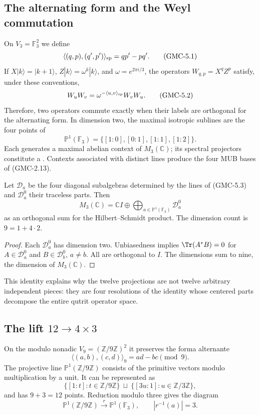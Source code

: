 \subsection{The alternating form and the Weyl commutation}

On $V_3=\mathbb F_3^2$ we define
\[
 \langle(q,p),(q',p')\rangle_{\rm sp}=qp'-pq'.
 \tag{GMC-5.1}
\]
If $X|k\rangle=|k+1\rangle$,
$Z|k\rangle=\omega^k|k\rangle$, and $\omega=e^{2\pi i/3}$, the operators
$W_{q,p}=X^qZ^p$ satisfy, under these conventions,
\[
 W_uW_v=\omega^{-\langle u,v\rangle_{\rm sp}}W_vW_u.
 \tag{GMC-5.2}
\]
Therefore, two operators commute exactly when their labels are
orthogonal for the alternating form. In dimension two, the maximal
isotropic sublines are the four points of
\[
 \mathbb P^1(\mathbb F_3)=\{[1:0],[0:1],[1:1],[1:2]\}.
 \tag{GMC-5.3}
\]
Each generates a maximal abelian context of $M_3(\mathbb C)$; its
spectral projectors constitute a \PVM. Contexts associated with distinct
lines produce the four MUB bases of \textup{(GMC-2.13)}.

\begin{proposition}
\label{p12-83-c2-s4:gmc:prop:descomposicion-masa-qutrit}
Let $\mathcal D_a$ be the four diagonal subalgebras determined by the
lines of \textup{(GMC-5.3)} and $\mathcal D_a^0$ their traceless parts. Then
\[
 M_3(\mathbb C)
 =\mathbb CI\oplus
   \bigoplus_{a\in\mathbb P^1(\mathbb F_3)}\mathcal D_a^0
 \tag{GMC-5.4}
\]
as an orthogonal sum for the Hilbert--Schmidt product. The dimension
count is $9=1+4\cdot2$.
\end{proposition}

\begin{proof}
Each $\mathcal D_a^0$ has dimension two. Unbiasedness implies
$\Tr(A^*B)=0$ for $A\in\mathcal D_a^0$ and
$B\in\mathcal D_b^0$, $a\ne b$. All are orthogonal to $I$. The
dimensions sum to nine, the dimension of $M_3(\mathbb C)$.
\end{proof}

This identity explains why the twelve projections are not twelve arbitrary
independent pieces: they are four resolutions of the identity whose centered
parts decompose the entire qutrit operator space.

\subsection{The lift \texorpdfstring{$12\to4\times3$}{12 to 4 by 3}}

On the modulo nonadic $V_9=(\mathbb Z/9\mathbb Z)^2$ it preserves the forma
alternante
\[
 \langle(a,b),(c,d)\rangle_9=ad-bc\pmod9.
 \tag{GMC-5.5}
\]
The projective line $\mathbb P^1(\mathbb Z/9\mathbb Z)$ consists of
the primitive vectors modulo multiplication by a unit. It can
be represented as
\[
 \{[1:t]:t\in\mathbb Z/9\mathbb Z\}
 \ \sqcup\ 
 \{[3u:1]:u\in\mathbb Z/3\mathbb Z\},
 \tag{GMC-5.6}
\]
and has $9+3=12$ points. Reduction modulo three gives the diagram
\[
 \mathbb P^1(\mathbb Z/9\mathbb Z)
 \xrightarrow{\ r\ }
 \mathbb P^1(\mathbb F_3),
 \qquad |r^{-1}(a)|=3.
 \tag{GMC-5.7}
\]

